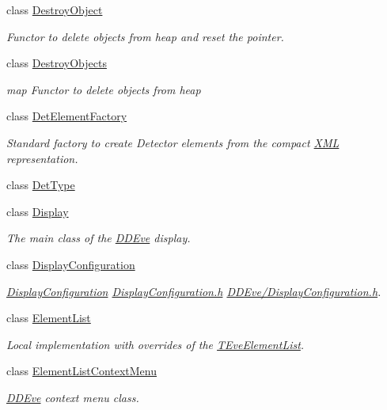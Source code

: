 \begin{DoxyCompactItemize}
class \hyperlink{class_d_d4hep_1_1_destroy_object}{Destroy\+Object}
\begin{DoxyCompactList}\small\item\em Functor to delete objects from heap and reset the pointer. \end{DoxyCompactList}\item 
class \hyperlink{class_d_d4hep_1_1_destroy_objects}{Destroy\+Objects}
\begin{DoxyCompactList}\small\item\em map Functor to delete objects from heap \end{DoxyCompactList}\item 
class \hyperlink{class_d_d4hep_1_1_det_element_factory}{Det\+Element\+Factory}
\begin{DoxyCompactList}\small\item\em Standard factory to create Detector elements from the compact \hyperlink{namespace_d_d4hep_1_1_x_m_l}{X\+ML} representation. \end{DoxyCompactList}\item 
class \hyperlink{class_d_d4hep_1_1_det_type}{Det\+Type}
\item 
class \hyperlink{class_d_d4hep_1_1_display}{Display}
\begin{DoxyCompactList}\small\item\em The main class of the \hyperlink{struct_d_d4hep_1_1_d_d_eve}{D\+D\+Eve} display. \end{DoxyCompactList}\item 
class \hyperlink{class_d_d4hep_1_1_display_configuration}{Display\+Configuration}
\begin{DoxyCompactList}\small\item\em \hyperlink{class_d_d4hep_1_1_display_configuration}{Display\+Configuration} \hyperlink{_display_configuration_8h}{Display\+Configuration.\+h} \hyperlink{_display_configuration_8h}{D\+D\+Eve/\+Display\+Configuration.\+h}. \end{DoxyCompactList}\item 
class \hyperlink{class_d_d4hep_1_1_element_list}{Element\+List}
\begin{DoxyCompactList}\small\item\em Local implementation with overrides of the \hyperlink{class_t_eve_element_list}{T\+Eve\+Element\+List}. \end{DoxyCompactList}\item 
class \hyperlink{class_d_d4hep_1_1_element_list_context_menu}{Element\+List\+Context\+Menu}
\begin{DoxyCompactList}\small\item\em \hyperlink{struct_d_d4hep_1_1_d_d_eve}{D\+D\+Eve} context menu class. \end{DoxyCompactList}\item 

\end{DoxyCompactItemize}
